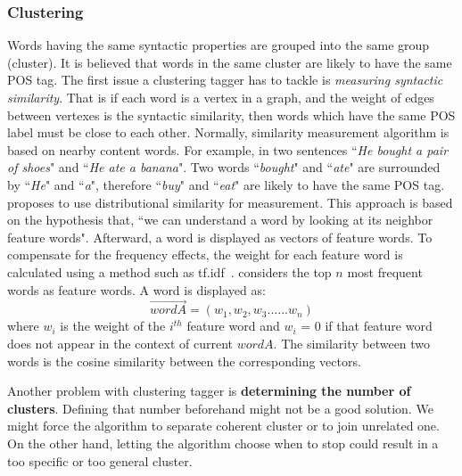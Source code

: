 \subsubsection{Clustering}
Words having the same syntactic properties are grouped into the same group (cluster). It is believed that words in the same cluster are likely to have the same POS tag. The first issue a clustering tagger has to tackle is \textit{measuring syntactic similarity}. That is if each word is a vertex in a graph, and the weight of edges between vertexes is the syntactic similarity, then words which have the same POS label must be close to each other. Normally, similarity measurement algorithm is based on nearby content words. For example, in two sentences ``\textit{He bought a pair of shoes}" and ``\textit{He ate a banana}". Two words ``\textit{bought}" and ``\textit{ate}" are surrounded by ``\textit{He}" and ``\textit{a}", therefore ``\textit{buy}" and ``\textit{eat}" are likely to have the same POS tag.  proposes to use distributional similarity for measurement. This approach is based on the hypothesis that, ``we can understand a word by looking at its neighbor feature words". Afterward, a word is displayed as vectors of feature words. To compensate for the frequency effects, the weight for each feature word is calculated using a method such as tf.idf~\cite{tfidf}.  considers the top $n$ most frequent words as feature words. A word is displayed as: 
$$\overrightarrow{word A} = (w_1,w_2,w_3......w_n)$$
where $w_i$ is the weight of the $i^{th}$ feature word and $w_i$ = 0 if that feature word does not appear in the context of current $word A$. The similarity between two words is the cosine similarity between the corresponding vectors. 

Another problem with clustering tagger is \textbf{determining the number of clusters}. Defining that number beforehand might not be a good solution. We might force the algorithm to separate coherent cluster or to join unrelated one. On the other hand, letting the algorithm choose when to stop could result in a too specific or too general cluster. 

